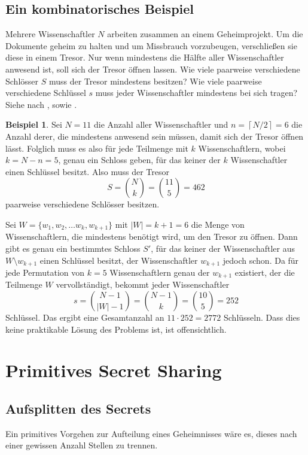 \documentclass[12pt, a4paper, oneside, titlepage]{report}
\theoremstyle{definition}
\newtheorem{bsp}[lemma]{Beispiel}
\begin{document}
	\subsection{Ein kombinatorisches Beispiel}
	
	Mehrere Wissenschaftler $ N $ arbeiten zusammen an einem Geheimprojekt. Um die Dokumente geheim zu halten und um Missbrauch vorzubeugen, verschließen sie diese in einem Tresor. Nur wenn mindestens die Hälfte aller Wissenschaftler anwesend ist, soll sich der Tresor öffnen lassen. Wie viele paarweise verschiedene Schlösser $ S $ muss der Tresor mindestens besitzen? Wie viele paarweise verschiedene Schlüssel $ s $ muss jeder Wissenschaftler mindestens bei sich tragen? Siehe \cite{shamir} nach \cite{liu}, sowie \cite{quantum}.
	
	\begin{bsp}
		Sei $ N = 11 $ die Anzahl aller Wissenschaftler und $ n = \left\lceil N / 2 \right\rceil = 6 $ die Anzahl derer, die mindestens anwesend sein müssen, damit sich der Tresor öffnen lässt. Folglich muss es also für jede Teilmenge mit $ k $ Wissenschaftlern, wobei $ k = N - n = 5 $, genau ein Schloss geben, für das keiner der $ k $ Wissenschaftler einen Schlüssel besitzt. Also muss der Tresor $$ S = \binom{N}{k} = \binom{11}{5} = 462 $$ paarweise verschiedene Schlösser besitzen.
		
		Sei $ W = \{w_1, w_2, \dots w_k, w_{k+1}\} $ mit $ |W| = k + 1 = 6 $ die Menge von Wissenschaftlern, die mindestens benötigt wird, um den Tresor zu öffnen. Dann gibt es genau ein bestimmtes Schloss $ S' $, für das keiner der Wissenschaftler aus $ W \setminus w_{k+1} $ einen Schlüssel besitzt, der Wissenschaftler $ w_{k+1} $ jedoch schon. Da für jede Permutation von $ k = 5 $ Wissenschaftlern genau der $ w_{k+1} $ existiert, der die Teilmenge $ W $ \glqq vervollständigt\grqq, bekommt jeder Wissenschaftler $$ s = \binom{N-1}{|W|-1} = \binom{N-1}{k} = \binom{10}{5} = 252 $$ Schlüssel. Das ergibt eine Gesamtanzahl an $ 11 \cdot 252 = 2772 $ Schlüsseln. Dass dies keine praktikable Lösung des Problems ist, ist offensichtlich.
	\end{bsp}
	\section{Primitives Secret Sharing}
	\subsection{Aufsplitten des Secrets}
		Ein primitives Vorgehen zur Aufteilung eines Geheimnisses wäre es, dieses nach einer gewissen Anzahl Stellen zu trennen.
		
\end{document}
